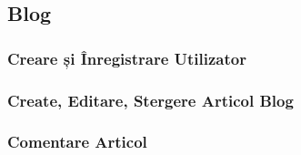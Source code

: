 \documentclass[11pt]{scrartcl} %
\begin{document}



\subsection{Blog}


\subsubsection{Creare și Înregistrare Utilizator}


\subsubsection{Create, Editare, Stergere Articol Blog}


\subsubsection{Comentare Articol}

\end{document}
